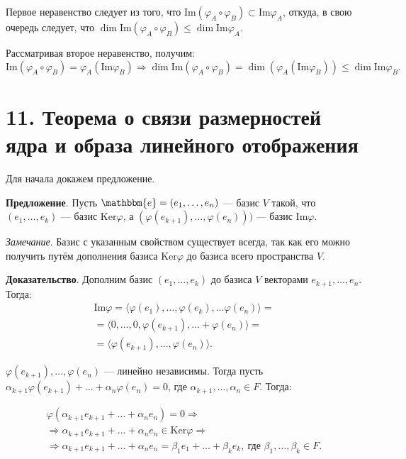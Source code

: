 \documentclass[a4paper, 12pt]{article}
\newcommand{\me}{\mathbbm{e}}
\newcommand{\Ker}{\text{Ker}}
\renewcommand{\Im}{\text{Im}}
\begin{document}
Первое неравенство следует из того, что $\Im(\varphi_A \circ \varphi_B) \subset \Im\varphi_A$, откуда, в свою очередь следует, что $\dim\Im(\varphi_A \circ \varphi_B) \leqslant \dim\Im\varphi_A$.

Рассматривая второе неравенство, получим:
\vspace{-3mm}
\[
\Im(\varphi_A \circ \varphi_B) = \varphi_A(\Im\varphi_B) \Longrightarrow \dim\Im(\varphi_A \circ \varphi_B) = \dim(\varphi_A(\Im\varphi_B)) \leqslant \dim\Im\varphi_B.
\]

\section*{11. Теорема о связи размерностей ядра и образа линейного отображения}
Для начала докажем предложение.

\textbf{Предложение}. Пусть $\me = (e_1, \ldots, e_n)$ --- базис $V$ такой, что $(e_1, \ldots, e_k)$ --- базис $\Ker\varphi$, а $(\varphi(e_{k + 1}), \ldots, \varphi(e_n)))$ --- базис $\Im\varphi$.

\textit{Замечание}. Базис с указанным свойством существует всегда, так как его можно получить путём дополнения базиса $\Ker\varphi$ до базиса всего пространства $V$.

\textbf{Доказательство}. Дополним базис $(e_1, \ldots, e_k)$ до базиса $V$ векторами $e_{k + 1}, \ldots, e_n$. Тогда:
\vspace{-3mm}
\begin{align*}
\Im\varphi = \langle \varphi(e_1), \ldots, \varphi(e_k), \ldots \varphi(e_n) \rangle = \\ = \langle 0, \ldots, 0, \varphi(e_{k + 1}), \ldots + \varphi(e_n) \rangle = \\ = \langle \varphi(e_{k + 1}), \ldots, \varphi(e_n) \rangle.
\end{align*}

\vspace{-3mm}
$\varphi(e_{k + 1}), \ldots, \varphi(e_n)$ --- линейно независимы. Тогда пусть $\alpha_{k + 1}\varphi(e_{k + 1}) + \ldots + \alpha_n\varphi(e_n) = 0$, где $\alpha_{k + 1}, \ldots, \alpha_n \in F$. Тогда:

\vspace{-9mm}
\begin{gather*}
\varphi(\alpha_{k + 1}e_{k + 1} + \ldots + \alpha_ne_n) = 0 \Rightarrow \\
\Rightarrow \alpha_{k + 1}e_{k + 1} + \ldots + \alpha_ne_n \in \Ker\varphi \Rightarrow \\
\Rightarrow \alpha_{k + 1}e_{k + 1} + \ldots + \alpha_ne_n = \beta_{1}e_{1} + \ldots + \beta_ke_k,\ \text{где } \beta_{1}, \ldots, \beta_k \in F.
\end{gather*}
\end{document}
